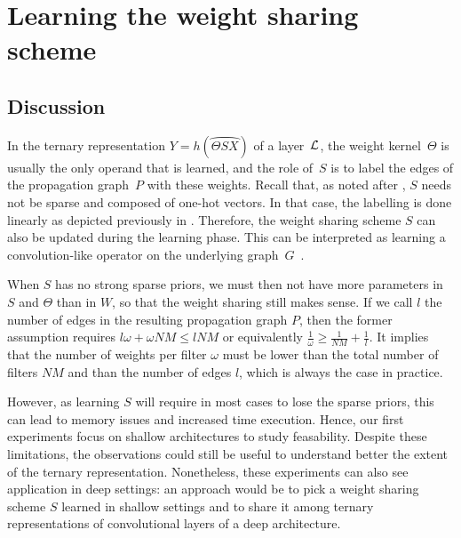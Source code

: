 \section{Learning the weight sharing scheme}
\label{sec:learningscheme}

\subsection{Discussion}

In the ternary representation $Y = h(\wideparen{\Theta S X})$ of a layer~$\mathcal{L}$, the weight kernel~$\Theta$ is usually the only operand that is learned, and the role of~$S$ is to label the edges of the propagation graph~$P$ with these weights. Recall that, as noted after , $S$ needs not be sparse and composed of one-hot vectors. In that case, the labelling is done linearly as depicted previously in . Therefore, the weight sharing scheme $S$ can also be updated during the learning phase. This can be interpreted as learning a convolution-like operator on the underlying graph~$G$~\citep{vialatte2017learning}.

\begin{remark}
When $S$ has no strong sparse priors, we must then not have more parameters in $S$ and $\Theta$ than in $W$, so that the weight sharing still makes sense. If we call $l$ the number of edges in the resulting propagation graph $P$, then the former assumption requires $l\omega + \omega NM \leq lNM$ or equivalently $\frac{1}{\omega} \geq \frac{1}{NM} + \frac{1}{l}$. It implies that the number of weights per filter $\omega$ must be lower than the total number of filters $NM$ and than the number of edges $l$, which is always the case in practice.
\end{remark}

However, as learning $S$ will require in most cases to lose the sparse priors, this can lead to memory issues and increased time execution. Hence, our first experiments focus on shallow architectures to study feasability. Despite these limitations, the observations could still be useful to understand better the extent of the ternary representation. Nonetheless, these experiments can also see application in deep settings: an approach would be to pick a weight sharing scheme $S$ learned in shallow settings and to share it among ternary representations of convolutional layers of a deep architecture.


